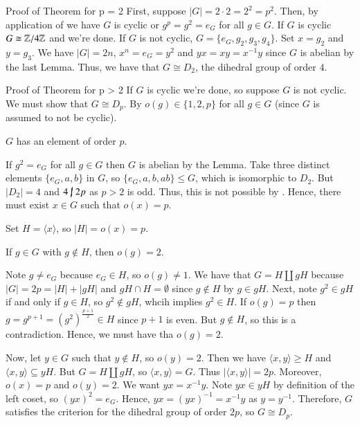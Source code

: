 \documentclass[12pt, a4paper, twoside, openright, titlepage]{book}
\begin{document}
\begin{prooflab}{Proof of Theorem for p = 2}{}
        First, suppose $|G| = 2\cdot 2 = 2^2 = p^2$. Then, by application of  we have $G$ is cyclic or $g^p = g^2 = e_G$ for all $g \in G$. If $G$ is cyclic $G \cong \mathbb Z/4\mathbb Z$ and we're done. If $G$ is not cyclic, $G = \{e_G,g_2,g_3,g_4\}$. Set $x = g_2$ and $y = g_3$. We have $|G| = 2n$, $x^n = e_G = y^2$ and $yx= xy = x^{-1}y$ since $G$ is abelian by the last Lemma. Thus, we have that $G \cong D_2$, the dihedral group of order $4$.
\end{prooflab}

\begin{prooflab}{Proof of Theorem for p > 2}{}
        If $G$ is cyclic we're done, so suppose $G$ is not cyclic. We must show that $G \cong D_p$. By  $o(g) \in \{1,2,p\}$ for all $g \in G$ (since $G$ is assumed to not be cyclic). 

        \begin{claim}{}{}
                $G$ has an element of order $p$.
        \end{claim}
        \begin{proof*}{}{}
                If $g^2 = e_G$ for all $g \in G$ then $G$ is abelian by the Lemma. Take three distinct elements $\{e_G, a, b\}$ in $G$, so $\{e_G,a,b,ab\} \leq G$, which is isomorphic to $D_2$. But $|D_2| = 4$ and $4 \;\cancel{\vert}\;2p$ as $p > 2$ is odd. Thus, this is not possible by . Hence, there must exist $x \in G$ such that $o(x) = p$.
        \end{proof*}
        Set $H = \langle x \rangle$, so $|H| = o(x) = p$.
        
        \begin{claim}{}{}
                If $g \in G$ with $g \notin H$, then $o(g) = 2$.
        \end{claim}
        \begin{proof*}{}{}
                Note $g \neq e_G$ because $e_G \in H$, so $o(g) \neq 1$. We have that $G = H\coprod gH$ because $|G| = 2p = |H| + |gH|$ and $gH \cap H =\emptyset$ since $g \notin H$ by $g \in gH$. Next, note $g^2 \in gH$ if and only if $g \in H$, so $g^2 \notin gH$, whcih implies $g^2 \in H$. If $o(g) = p$ then $g = g^{p+1} = (g^2)^{\frac{p+1}{2}} \in H$ since $p+1$ is even. But $g \notin H$, so this is a contradiction. Hence, we must have tha $o(g) = 2$.
        \end{proof*}

        Now, let $y \in G$ such that $y \notin H$, so $o(y) = 2$. Then we have $\langle x,y\rangle \geq H$ and $\langle x, y \rangle \subseteq yH$. But $G = H\coprod gH$, so $\langle x,y \rangle = G$. Thus $|\langle x,y \rangle| = 2p$. Moreover, $o(x) = p$ and $o(y) = 2$. We want $yx = x^{-1}y$. Note $yx \in yH$ by definition of the left coset, so $(yx)^2 = e_G$. Hence, $yx = (yx)^{-1} = x^{-1}y$ as $y = y^{-1}$. Therefore, $G$ satisfies the criterion for the dihedral group of order $2p$, so $G \cong D_p$.
\end{prooflab}
\end{document}
